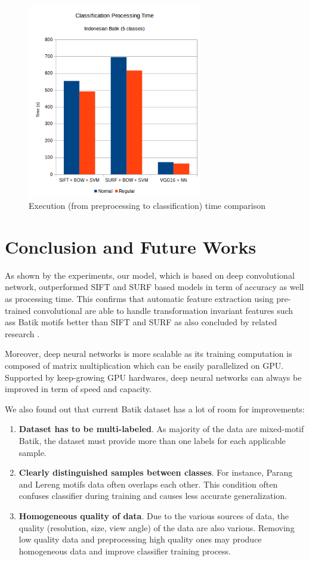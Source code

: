 \documentclass[conference]{IEEEtran}
\begin{document}
\begin{figure}
\centering
\includegraphics[width=3.0in]{chart_time}
\caption{Execution (from preprocessing to classification) time comparison}
\label{fig_time_comparison}
\end{figure}


\section{Conclusion and Future Works}

As shown by the experiments, our model, which is based on deep convolutional network, outperformed SIFT and SURF based models in term of accuracy as well as processing time. This confirms that automatic feature extraction using pre-trained convolutional are able to handle transformation invariant features such ass Batik motifs better than SIFT and SURF as also concluded by related research \cite{fischer2014descriptor}.

Moreover, deep neural networks is more scalable as its training computation is composed of matrix multiplication which can be easily parallelized on GPU. Supported by keep-growing GPU hardwares, deep neural networks can always be improved in term of speed and capacity.

We also found out that current Batik dataset has a lot of room for improvements:

\begin{enumerate}
\item \textbf{Dataset has to be multi-labeled}. As majority of the data are mixed-motif Batik, the dataset must provide more than one labels for each applicable sample.
\item \textbf{Clearly distinguished samples between classes}. For instance, Parang and Lereng motifs data often overlaps each other. This condition often confuses classifier during training and causes less accurate generalization.
\item \textbf{Homogeneous quality of data}. Due to the various sources of data, the quality (resolution, size, view angle) of the data are also various. Removing low quality data and preprocessing high quality ones may produce homogeneous data and improve classifier training process.
\end{enumerate}

\ifCLASSOPTIONcaptionsoff
  \newpage
\fi




\end{document}
